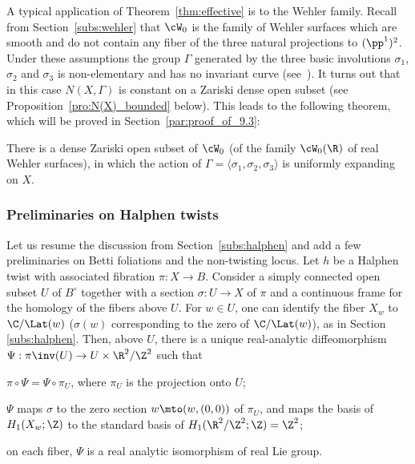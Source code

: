 A typical application of Theorem~\ref{thm:effective} is to the Wehler family.
Recall from Section~\ref{subs:wehler}
that ${ \cW}_0$ is the family of Wehler surfaces which are smooth and do not contain any
fiber of the three natural projections to
$(\pp^1)^2$.
Under these assumptions the group $\Gamma$ generated by the three basic involutions
$\sigma_1$, $\sigma_2$ and $\sigma_3$ is non-elementary and
has no invariant curve (see~\cite[Prop.\,2.2]{finite_orbits}).
It turns out that in this case $N(X, \Gamma)$ is constant on a Zariski
dense open subset (see Proposition~\ref{pro:N(X)_bounded} below).
This leads to the following theorem, which will be proved in Section~\ref{par:proof_of_9.3}:

\begin{thm}\label{thm:wehler_zariski}
There is a dense Zariski open subset of ${ \cW}_0$
(\resp of the family ${ \cW}_0(\R)$ of real Wehler surfaces),
in which the action of $\Gamma=\langle \sigma_1, \sigma_2, \sigma_3\rangle$ is
uniformly expanding on $X$.
\end{thm}

\subsubsection{Preliminaries on Halphen twists}\label{par:preliminaries2_on_Halphen} Let us resume the discussion from Section~\ref{subs:halphen} and add a few preliminaries on Betti foliations and the non-twisting locus. Let $h$ be a Halphen twist with associated fibration $\pi\colon X\to B$.
Consider a simply connected open subset $U$ of $B^\circ$ together with a section $\sigma\colon U\to X$ of $\pi$
and a continuous frame for the homology of the fibers above $U$.
For $w\in U$, one can identify the fiber $X_w$ to $\C/\Lat(w)$ ($\sigma(w)$ corresponding to the zero of $\C/\Lat(w)$), as in Section \ref{subs:halphen}.
Then, above $U$, there is a unique real-analytic diffeomorphism $\Psi: \pi \inv(U)\to U\times \R^2/\Z^2$
such that
\begin{enumeratea}
\item
$\pi\circ \Psi=\Psi\circ \pi_U$, where $\pi_U$ is the projection onto $U$;
\item
$\Psi$ maps $\sigma$ to the zero section $w\mto (w, (0,0))$ of $\pi_U$, and maps the basis of $H_1(X_w;\Z)$ to the standard basis of $H_1(\R^2/\Z^2; \Z)=\Z^2$;
\item
on each fiber, $\Psi$ is a real analytic isomorphism of real Lie group.
\end{enumeratea}

